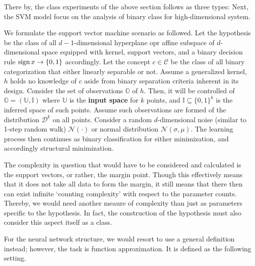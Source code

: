 \documentclass[10pt,oneside,oldfontcommands,dvipsnames,article]{memoir}
\begin{document}
There by, the class experiments of the above section follows as three types: 
\vspace{2mm}
Next, the SVM model focus on the analysis of binary class for high-dimensional system. 
\vspace{2mm}
\begin{setting}
    We formulate the support vector machine scenario as followed. Let the hypothesis be the class of all $d-1$-dimensional hyperplane opr affine subspace of $d$-dimensional space equipped with kernel, support vectors, and a binary decision rule $\operatorname{sign}{x}\to \{0,1\}$ accordingly. Let the concept $c\in \mathcal{C}$ be the class of all binary categorization that either linearly separable or not. Assume a generalized kernel, $h$ holds no knowledge of $c$ aside from binary separation criteria inherent in its design. Consider the set of observations $\mathbb{O}$ of $h$. Then, it will be controlled of $\mathbb{O}=(\mathbb{U},\mathbb{I})$ where $\mathbb{U}$ is the \textbf{input space} for $k$ points, and $\mathbb{I}\subseteq \{0,1\}^{k}$ is the inferred space of such points. Assume such observations are formed of the distribution $\mathcal{D}^{k}$ on all points. Consider a random $d$-dimensional noise (similar to 1-step random walk) $\mathcal{N}(\cdot)$ or normal distribution $\mathcal{N}(\sigma, \mu)$. The learning process then continues as binary classification for either minimization, and accordingly structural minimization. 
\end{setting}
The complexity in question that would have to be considered and calculated is the support vectors, or rather, the margin point. Though this effectively means that it does not take all data to form the margin, it still means that there then can exist infinite `counting complexity' with respect to the parameter counts. Thereby, we would need another meaure of complexity than just as parameters specific to the hypothesis. In fact, the construction of the hypothesis must also consider this aspect itself as a class. 

For the neural network structure, we would resort to use a general definition instead; however, the task is function approximation. It is defined as the following setting. 
\vspace{2mm}
\end{document}
